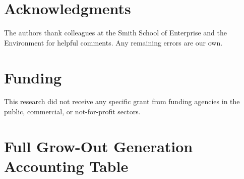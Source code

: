 \documentclass[review,3p,authoryear]{elsarticle}
\begin{document}
\section*{Acknowledgments}

The authors thank colleagues at the Smith School of Enterprise and the Environment for helpful comments. Any remaining errors are our own.

\section*{Funding}

This research did not receive any specific grant from funding agencies in the public, commercial, or not-for-profit sectors.

\appendix

\section{Full Grow-Out Generation Accounting Table}
\label{app:growout_full}
\end{document}
